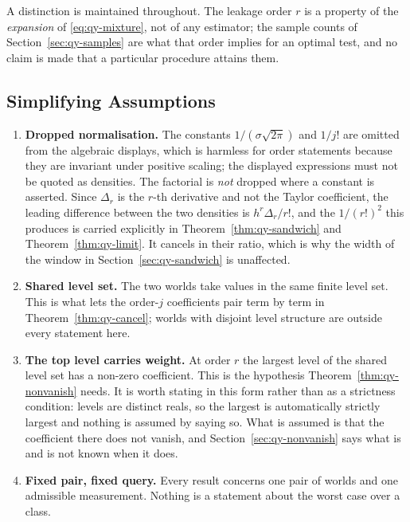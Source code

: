 A distinction is maintained throughout. The leakage order $r$ is a property of the
\emph{expansion} of \eqref{eq:qy-mixture}, not of any estimator; the sample counts of
Section~\ref{sec:qy-samples} are what that order implies for an optimal test, and no claim is
made that a particular procedure attains them.

\subsection{Simplifying Assumptions}

\begin{enumerate}
\item[1)] \textbf{Dropped normalisation.} The constants $1/(\sigma\sqrt{2\pi})$ and $1/j!$ are
omitted from the algebraic displays, which is harmless for order statements because they are
invariant under positive scaling; the displayed expressions must not be quoted as densities.
The factorial is \emph{not} dropped where a constant is asserted. Since $\Delta_{r}$ is the
$r$-th derivative and not the Taylor coefficient, the leading difference between the two
densities is $h^{r}\Delta_{r}/r!$, and the $1/(r!)^{2}$ this produces is carried explicitly in
Theorem~\ref{thm:qy-sandwich} and Theorem~\ref{thm:qy-limit}. It cancels in their ratio, which is
why the width of the window in Section~\ref{sec:qy-sandwich} is unaffected.

\item[2)] \textbf{Shared level set.} The two worlds take values in the same finite level
set. This is what lets the order-$j$ coefficients pair term by term in
Theorem~\ref{thm:qy-cancel}; worlds with disjoint level structure are outside every statement
here.

\item[3)] \textbf{The top level carries weight.} At order $r$ the largest level of the shared
level set has a non-zero coefficient. This is the hypothesis
Theorem~\ref{thm:qy-nonvanish} needs. It is worth stating in this form rather than as a
strictness condition: levels are distinct reals, so the largest is automatically strictly
largest and nothing is assumed by saying so. What is assumed is that the coefficient there
does not vanish, and Section~\ref{sec:qy-nonvanish} says what is and is not known when it does.

\item[4)] \textbf{Fixed pair, fixed query.} Every result concerns one pair of worlds and one
admissible measurement. Nothing is a statement about the worst case over a class.
\end{enumerate}

